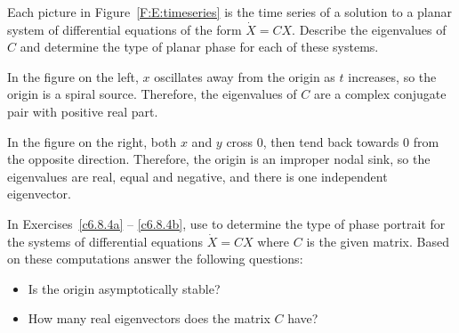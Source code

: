 \documentclass{ximera}
\begin{document}
\begin{exercise} \label{c6.8.3}
Each picture in Figure~\ref{F:E:timeseries} is the time series of a
solution to a planar system of differential equations of the form
$\dot{X}=CX$.  Describe the eigenvalues of $C$ and determine the type
of planar phase for each of these systems.

\begin{solution}

In the figure on the left, $x$ oscillates away from the origin as $t$
increases, so the origin is a spiral source.  Therefore, the eigenvalues
of $C$ are a complex conjugate pair with positive real part.

\para In the figure on the right, both $x$ and $y$ cross $0$, then
tend back towards $0$ from the opposite direction.  Therefore, the origin
is an improper nodal sink, so the eigenvalues are real, equal and
negative, and there is one independent eigenvector.

\end{solution}
\end{exercise}
\begin{figure*}[htb]
        \centerline{%
        }
	\caption{Time series for planar systems.}
	\label{F:E:timeseries}
\end{figure*}


\CEXER

\noindent In Exercises~\ref{c6.8.4a} -- \ref{c6.8.4b}, use {\pplane} to
determine the type of phase portrait for the systems of differential equations
$\dot{X}=CX$ where $C$ is the given matrix.  Based on these computations
answer the following questions:
\begin{itemize}
\item[(a)]  Is the origin asymptotically stable?
\item[(b)]  How many real eigenvectors does the matrix $C$ have?
\end{itemize}
\end{document}
